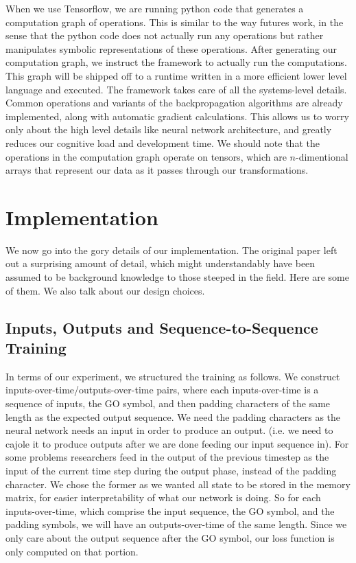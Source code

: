 \documentclass[12pt]{article}
\begin{document}
When we use Tensorflow, we are running python code that generates a computation
graph of operations. This is similar to the way futures work, in the sense
that the python code does not actually run any operations but rather
manipulates symbolic representations of these operations. After generating
our computation graph, we instruct the framework to actually run the computations.
This graph will be shipped off to a runtime written in a more efficient lower level
language and executed. The framework takes care of all the systems-level details.
Common operations and variants of the backpropagation algorithms are already implemented,
along with automatic gradient calculations. This allows us to worry only about the
high level details like neural network architecture, and greatly reduces our cognitive
load and development time. We should note that the operations in the computation graph
operate on tensors, which are $n$-dimentional arrays that represent our data as
it passes through our transformations.

\section{Implementation}\label{implementation}

We now go into the gory details of our implementation. The original paper left out
a surprising amount of detail, which might understandably have been
assumed to be background knowledge to those steeped in the field. Here are
some of them. We also talk about our design choices.

\subsection{Inputs, Outputs and Sequence-to-Sequence Training}

In terms of our experiment, we structured the training as follows. We
construct inputs-over-time/outputs-over-time pairs, where each inputs-over-time
is a sequence of inputs, the GO symbol, and then padding characters of the same length as the
expected output sequence. We need the padding characters as the neural network needs an input in order to
produce an output. (i.e. we need to cajole it to produce outputs after we are done
feeding our input sequence in). For some problems researchers feed in the output of the previous
timestep as the input of the current time step during the output phase,
instead of the padding character.
We chose the former as we wanted all state to be stored in the memory 
matrix, for easier interpretability of what our network is doing. So for each inputs-over-time,
which comprise the input sequence, the GO symbol, and the padding symbols,
we will have an outputs-over-time of the same length.
Since we only care about the output sequence after the GO symbol,
our loss function is only computed on that portion.
\end{document}
